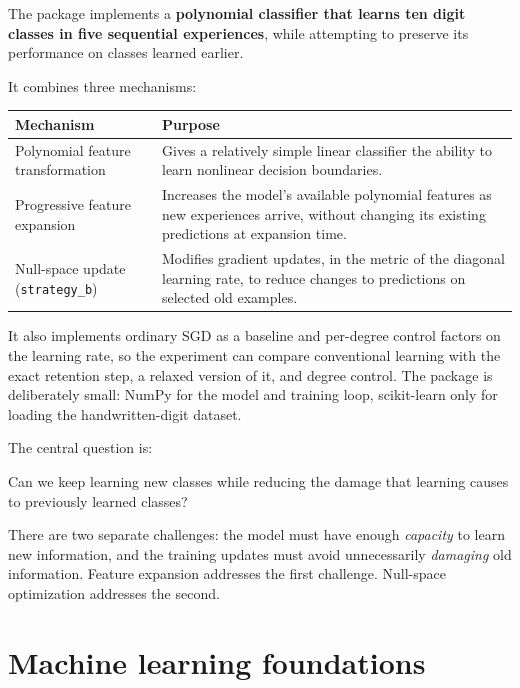 \documentclass[11pt,a4paper]{article}
\newcommand{\code}[1]{\texttt{#1}}
\begin{document}
The package implements a \textbf{polynomial classifier that learns ten digit classes in five sequential experiences}, while attempting to preserve its performance on classes learned earlier.

It combines three mechanisms:

\begin{center}
\begin{tabular}{@{}p{4.6cm}p{10.4cm}@{}}
\toprule
\textbf{Mechanism} & \textbf{Purpose}\\
\midrule
Polynomial feature transformation & Gives a relatively simple linear classifier the ability to learn nonlinear decision boundaries.\\
Progressive feature expansion & Increases the model's available polynomial features as new experiences arrive, without changing its existing predictions at expansion time.\\
Null-space update (\code{strategy\_b}) & Modifies gradient updates, in the metric of the diagonal learning rate, to reduce changes to predictions on selected old examples.\\
\bottomrule
\end{tabular}
\end{center}

It also implements ordinary SGD as a baseline and per-degree control factors on the learning rate, so the experiment can compare conventional learning with the exact retention step, a relaxed version of it, and degree control. The package is deliberately small: NumPy for the model and training loop, scikit-learn only for loading the handwritten-digit dataset.

The central question is:

\begin{keybox}[title={The central question}]
Can we keep learning new classes while reducing the damage that learning causes to previously learned classes?
\end{keybox}

There are two separate challenges: the model must have enough \emph{capacity} to learn new information, and the training updates must avoid unnecessarily \emph{damaging} old information. Feature expansion addresses the first challenge. Null-space optimization addresses the second.

\part{Machine learning foundations}
\end{document}
